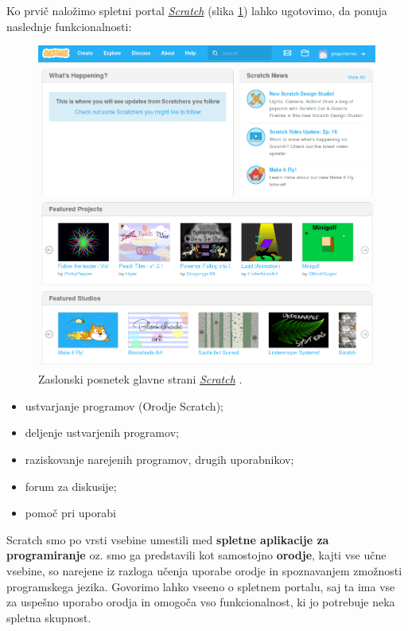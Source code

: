 Ko prvič naložimo spletni portal
\emph{\href{https://scratch.mit.edu/}{Scratch}} (slika
\ref{fig:web:scratch:main}) lahko ugotovimo, da ponuja naslednje
funkcionalnosti:

\begin{figure}[h!]
  \centering
    \includegraphics [width=0.90\linewidth, keepaspectratio =
   1] {./images/sc_web/scratch_mainP-v01.png}
   \caption{Zaslonski posnetek glavne strani
     \emph{\href{https://scratch.mit.edu/}{Scratch}}
     \cite{web:scratch}.}
    \label{fig:web:scratch:main}
\end{figure}

\begin{itemize}
\item ustvarjanje programov (Orodje Scratch);
\item deljenje ustvarjenih programov;
\item raziskovanje narejenih programov, drugih uporabnikov;
\item forum za diskusije;
\item pomoč pri uporabi
\end{itemize}

Scratch smo po vrsti vsebine umestili med \textbf{spletne aplikacije
  za programiranje} oz. smo ga predstavili kot samostojno
\textbf{orodje}, kajti vse učne vsebine, so narejene iz razloga učenja
uporabe orodje in spoznavanjem zmožnosti programskega jezika. Govorimo
lahko vseeno o spletnem portalu, saj ta ima vse za uspešno uporabo
orodja in omogoča vso funkcionalnost, ki jo potrebuje neka spletna
skupnost.

